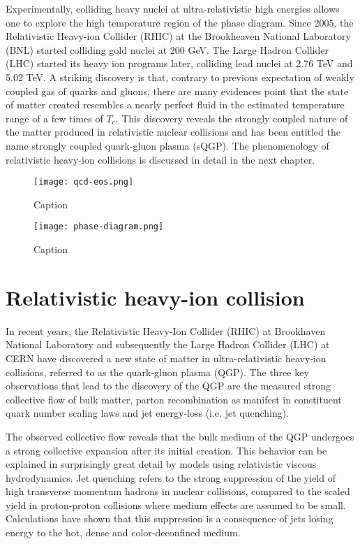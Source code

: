 Experimentally, colliding heavy nuclei at ultra-relativistic high energies allows one to explore the high temperature region of the phase diagram.
Since 2005, the Relativistic Heavy-ion Collider (RHIC) at the Brookheaven National Laboratory (BNL) started colliding gold nuclei at 200 GeV. 
The Large Hadron Collider (LHC) started its heavy ion programs later, colliding lead nuclei at 2.76 TeV and 5.02 TeV.
A striking discovery is that, contrary to previous expectation of weakly coupled gas of quarks and gluons, there are many evidences point that the state of matter created resembles a nearly perfect fluid in the estimated temperature range of a few times of $T_c$.
This discovery reveals the strongly coupled nature of the matter produced in relativistic nuclear collisions and has been entitled the name strongly coupled quark-gluon plasma (sQGP).
The phenomenology of relativistic heavy-ion collisions is discussed in detail in the next chapter.

\begin{figure}
    \centering
    \texttt{[image: qcd-eos.png]}
    \caption{Caption}
    \label{fig:qcd_eos}
\end{figure}

\begin{figure}
    \centering
    \texttt{[image: phase-diagram.png]}
    \caption{Caption}
    \label{fig:phase-diagram}
\end{figure}


\section{Relativistic heavy-ion collision}
In recent years, the Relativistic Heavy-Ion Collider (RHIC) at Brookhaven National Laboratory and subsequently the Large Hadron Collider (LHC) at CERN have discovered a new state of matter in ultra-relativistic heavy-ion collisions, referred to as the quark-gluon plasma (QGP).
The three key observations that lead to 
the discovery of the QGP are the measured strong collective flow of bulk matter, parton recombination as manifest in constituent quark number scaling laws and jet energy-loss (i.e. jet quenching). 

The observed collective flow reveals that the bulk medium of the QGP undergoes a strong collective expansion after its initial creation.
This behavior can be explained in surprisingly great detail by models using relativistic viscous hydrodynamics.
Jet quenching refers to the strong suppression of the yield of high transverse momentum hadrons in nuclear collisions, compared to the scaled yield in proton-proton collisions where medium effects are assumed to be small.
Calculations have shown that this suppression is a consequence of jets losing energy to the hot, dense and color-deconfined medium. 

